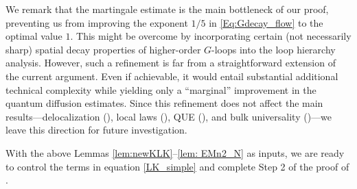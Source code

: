 \begin{remark}\label{rmk_bottleneck}
We remark that the martingale estimate is the main bottleneck of our proof, preventing us from improving the exponent $1/5$ in \eqref{Eq:Gdecay_flow} to the optimal value $1$. This might be overcome by incorporating certain (not necessarily sharp) spatial decay properties of higher-order $G$-loops into the loop hierarchy analysis. However, such a refinement is far from a straightforward extension of the current argument. Even if achievable, it would entail substantial additional technical complexity while yielding only a ``marginal'' improvement in the quantum diffusion estimates. Since this refinement does not affect the main results---delocalization (), local laws (), QUE (), and bulk universality ()---we leave this direction for future investigation.

\end{remark}

With the above Lemmas \ref{lem:newKLK}--\ref{lem: EMn2_N} as inputs, we are ready to control the terms in equation \eqref{LK_simple} and complete Step 2 of the proof of . 

